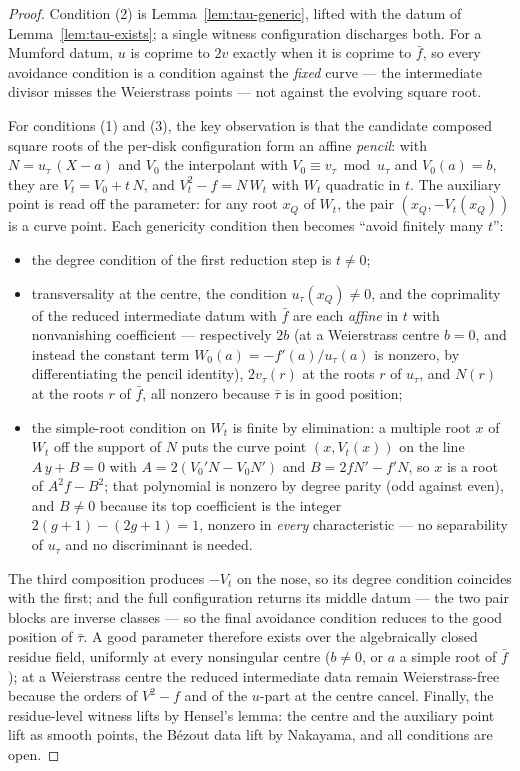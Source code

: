 \begin{proof}
\leanok
Condition (2) is Lemma~\ref{lem:tau-generic}, lifted with the datum of
Lemma~\ref{lem:tau-exists}; a single witness configuration discharges both. For a
Mumford datum, $u$ is coprime to $2v$ exactly when it is coprime to $\bar f$, so every
avoidance condition is a condition against the \emph{fixed} curve --- the intermediate
divisor misses the Weierstrass points --- not against the evolving square root.

For conditions (1) and (3), the key observation is that the candidate composed square
roots of the per-disk configuration form an affine \emph{pencil}: with
$N = u_\tau\,(X - a)$ and $V_0$ the interpolant with $V_0 \equiv v_\tau \bmod u_\tau$
and $V_0(a) = b$, they are $V_t = V_0 + t\,N$, and $V_t^2 - f = N\,W_t$ with $W_t$
quadratic in $t$. The auxiliary point is read off the parameter: for any root $x_Q$ of
$W_t$, the pair $(x_Q, -V_t(x_Q))$ is a curve point. Each genericity condition then
becomes ``avoid finitely many $t$'':
\begin{itemize}
\item the degree condition of the first reduction step is $t \neq 0$;
\item transversality at the centre, the condition $u_\tau(x_Q) \neq 0$, and the
coprimality of the reduced intermediate datum with $\bar f$ are each \emph{affine} in
$t$ with nonvanishing coefficient --- respectively $2b$ (at a Weierstrass centre
$b = 0$, and instead the constant term $W_0(a) = -f'(a)/u_\tau(a)$ is nonzero, by
differentiating the pencil identity), $2v_\tau(r)$ at the roots $r$ of $u_\tau$, and
$N(r)$ at the roots $r$ of $\bar f$, all nonzero because $\bar\tau$ is in good
position;
\item the simple-root condition on $W_t$ is finite by elimination: a multiple root $x$
of $W_t$ off the support of $N$ puts the curve point $(x, V_t(x))$ on the line
$A\,y + B = 0$ with $A = 2(V_0'N - V_0N')$ and $B = 2fN' - f'N$, so $x$ is a root of
$A^2f - B^2$; that polynomial is nonzero by degree parity (odd against even), and
$B \neq 0$ because its top coefficient is the integer $2(g+1) - (2g+1) = 1$, nonzero in
\emph{every} characteristic --- no separability of $u_\tau$ and no discriminant is
needed.
\end{itemize}
The third composition produces $-V_t$ on the nose, so its degree condition coincides
with the first; and the full configuration returns its middle datum --- the two pair
blocks are inverse classes --- so the final avoidance condition reduces to the good
position of $\bar\tau$. A good parameter therefore exists over the algebraically closed
residue field, uniformly at every nonsingular centre ($b \neq 0$, or $a$ a simple root
of $\bar f$); at a Weierstrass centre the reduced intermediate data remain
Weierstrass-free because the orders of $V^2 - f$ and of the $u$-part at the centre
cancel. Finally, the residue-level witness lifts by Hensel's lemma: the centre and the
auxiliary point lift as smooth points, the B\'ezout data lift by Nakayama, and all
conditions are open.
\end{proof}

